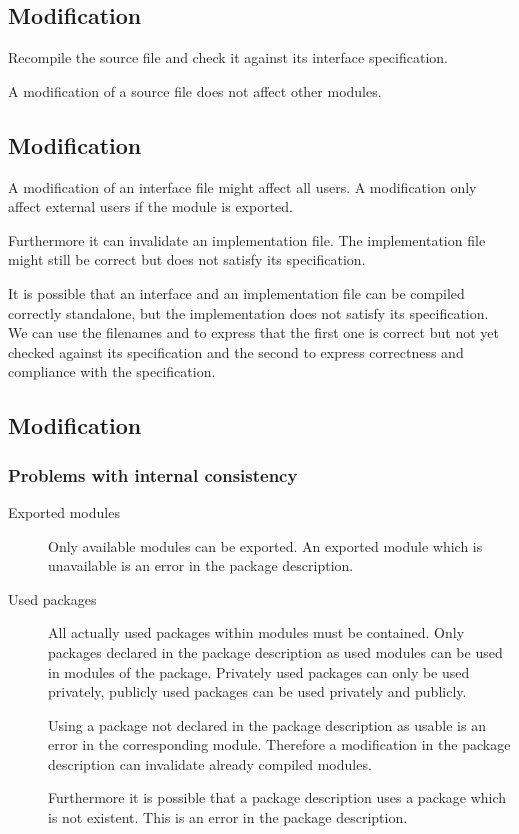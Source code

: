 \subsection{ Modification}

Recompile the source file and check it against its interface specification.

A modification of a source file does not affect other modules.


\subsection{ Modification}

A modification of an interface file might affect all users. A modification
only affect external users if the module is exported.

Furthermore it can invalidate an implementation file. The implementation file
might still be correct but does not satisfy its specification.

It is possible that an interface and an implementation file can be compiled
correctly standalone, but the implementation does not satisfy its
specification. We can use the filenames  and   to
express that the first one is correct but not yet checked against its
specification and the second to express correctness and compliance with the
specification.



\subsection{ Modification}


\subsubsection{Problems with internal consistency}

\begin{description}

\item[Exported modules] Only available modules can be exported. An exported
  module which is unavailable is an error in the package description.

\item[Used packages] All actually used packages within modules must be
  contained. Only packages declared in the package description as used modules
  can be used in modules of the package. Privately used packages can only be
  used privately, publicly used packages can be used privately and publicly.

  Using a package not declared in the package description as usable is an
  error in the corresponding module. Therefore a modification in the package
  description can invalidate already compiled modules.

  Furthermore it is possible that a package description uses a package which
  is not existent. This is an error in the package description.

\end{description}


